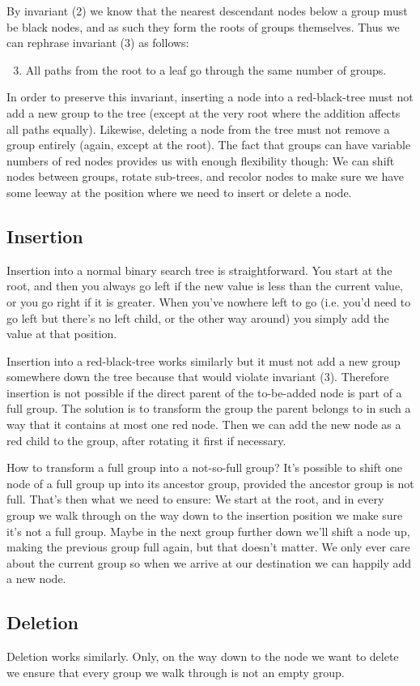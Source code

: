 \documentclass{article}
\begin{document}
By invariant (2) we know that the nearest descendant nodes below a group must be black
nodes, and as such they form the roots of groups themselves.  Thus we can rephrase
invariant (3) as follows:

\begin{enumerate}[label=(\arabic*)]
\setcounter{enumi}{2}
\item All paths from the root to a leaf go through the same number of groups.
\end{enumerate}

In order to preserve this invariant, inserting a node into a red-black-tree must not add
a new group to the tree (except at the very root where the addition affects all paths
equally). Likewise, deleting a node from the tree must not remove a group entirely
(again, except at the root). The fact that groups can have variable numbers of red nodes
provides us with enough flexibility though: We can shift nodes between groups, rotate
sub-trees, and recolor nodes to make sure we have some leeway at the position where we
need to insert or delete a node.

\subsection{Insertion}
Insertion into a normal binary search tree is straightforward. You start at the root,
and then you always go left if the new value is less than the current value, or you go
right if it is greater. When you've nowhere left to go (i.e. you'd need to go left but
there's no left child, or the other way around) you simply add the value at that
position.

Insertion into a red-black-tree works similarly but it must not add a new group
somewhere down the tree because that would violate invariant (3). Therefore insertion is
not possible if the direct parent of the to-be-added node is part of a full group. The
solution is to transform the group the parent belongs to in such a way that it contains
at most one red node. Then we can add the new node as a red child to the group, after
rotating it first if necessary.

How to transform a full group into a not-so-full group? It's possible to shift one
node of a full group up into its ancestor group, provided the ancestor group is not
full. That's then what we need to ensure: We start at the root, and in every group we
walk through on the way down to the insertion position we make sure it's not a full
group. Maybe in the next group further down we'll shift a node up, making the previous
group full again, but that doesn't matter. We only ever care about the current group so
when we arrive at our destination we can happily add a new node.

\subsection{Deletion}
Deletion works similarly. Only, on the way down to the node we want to delete we ensure
that every group we walk through is not an empty group.
\end{document}
